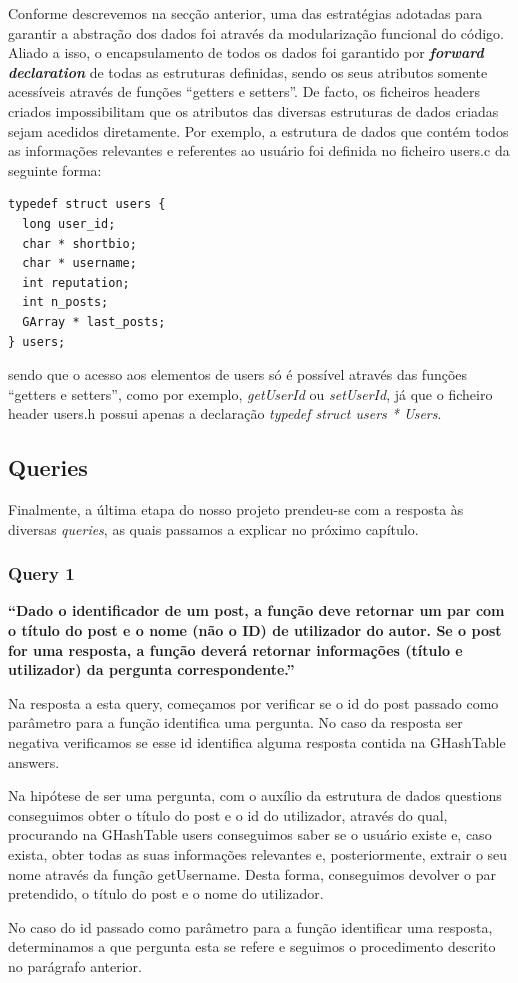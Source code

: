 \documentclass[a4paper]{article}
\begin{document}
Conforme descrevemos na secção anterior, uma das estratégias adotadas para garantir
a abstração dos dados foi através da modularização funcional do código.
Aliado a isso, o encapsulamento de todos os dados foi garantido por \textbf{\textit{forward declaration}}
de todas as estruturas definidas, sendo os seus atributos somente acessíveis através
de funções ``getters e setters''. De facto, os ficheiros headers criados impossibilitam
que os atributos das diversas estruturas de dados criadas sejam acedidos diretamente.
Por exemplo, a estrutura de dados que contém todos as informações relevantes e
referentes ao usuário foi definida no ficheiro users.c da seguinte forma:

\begin{verbatim}
typedef struct users {
  long user_id;
  char * shortbio;
  char * username;
  int reputation;
  int n_posts;
  GArray * last_posts;
} users;
\end{verbatim}

sendo que o acesso aos elementos de users só é possível através das funções
``getters e setters'', como por exemplo, \textit{getUserId} ou
\textit{setUserId}, já que o ficheiro header users.h possui apenas a declaração
\textit{typedef struct users * Users}.


\subsection{Queries}
\label{sec:queries}

Finalmente, a última etapa do nosso projeto prendeu-se com a resposta às diversas
\textit{queries}, as quais passamos a explicar no próximo capítulo.


\subsubsection*{Query 1}
\label{sec:query1}

\textbf{“Dado o identificador de um post, a função deve retornar
um par com o título do post e o nome (não o ID) de utilizador do autor. Se o post
for uma resposta, a função deverá retornar informações (título e utilizador)
da pergunta correspondente.”}


Na resposta a esta query, começamos por verificar se o id do post passado como
parâmetro  para a função identifica uma pergunta. No caso da resposta ser negativa
verificamos se esse id identifica alguma resposta contida na GHashTable answers. \par
Na hipótese de ser uma pergunta, com o auxílio da estrutura de dados questions
conseguimos obter o título do post e o id do utilizador, através do qual, procurando
na GHashTable users conseguimos saber se o usuário existe e, caso exista, obter
todas as suas informações relevantes e, posteriormente, extrair o seu nome através
da função getUsername. Desta forma, conseguimos devolver o par
pretendido, o título do post e o nome do utilizador. \par
No caso do id passado como parâmetro para a função identificar uma resposta, determinamos
a que pergunta esta se refere e seguimos o procedimento descrito no parágrafo anterior.
\end{document}
